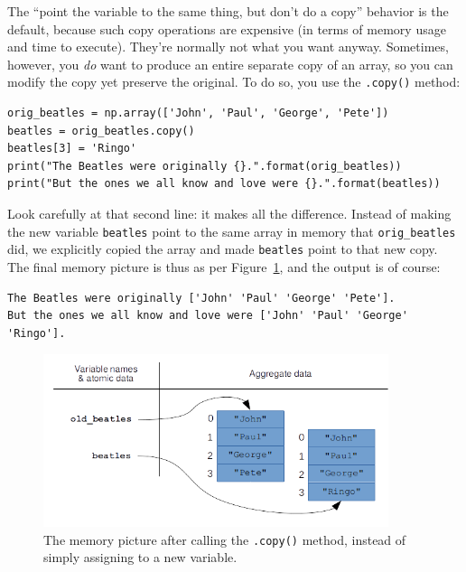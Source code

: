 The ``point the variable to the same thing, but don't do a copy'' behavior is
the default, because such copy operations are expensive (in terms of memory
usage and time to execute). They're normally not what you want anyway.
Sometimes, however, you \textit{do} want to produce an entire separate copy of
an array, so you can modify the copy yet preserve the original. To do so, you
use the \texttt{.copy()} method:

\begin{Verbatim}[fontsize=\small,samepage=true,frame=single,framesep=3mm]
orig_beatles = np.array(['John', 'Paul', 'George', 'Pete'])
beatles = orig_beatles.copy()
beatles[3] = 'Ringo'
print("The Beatles were originally {}.".format(orig_beatles))
print("But the ones we all know and love were {}.".format(beatles))
\end{Verbatim}

Look carefully at that second line: it makes all the difference. Instead of
making the new variable \texttt{beatles} point to the same array in memory that
\texttt{orig\_beatles} did, we explicitly copied the array and made
\texttt{beatles} point to that new copy. The final memory picture is thus as
per Figure~\ref{fig:copyNotRef}, and the output is of course:

\begin{Verbatim}[fontsize=\scriptsize,samepage=true,frame=leftline,framesep=5mm,framerule=1mm]
The Beatles were originally ['John' 'Paul' 'George' 'Pete'].
But the ones we all know and love were ['John' 'Paul' 'George' 'Ringo'].
\end{Verbatim}

\begin{figure}[ht]
\centering
\includegraphics[width=0.9\textwidth]{copyNotRef.png}
\caption{The memory picture after calling the \texttt{.copy()} method, instead
of simply assigning to a new variable.}
\label{fig:copyNotRef}
\end{figure}


